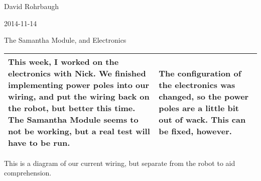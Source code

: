 David Rohrbaugh

2014-11-14

The Samantha Module, and Electronics

\begin{tabular}{|p{5cm}|p{5cm}|}
 \hline
 This week, I worked on the electronics with Nick. We finished implementing power poles into our wiring, and put the wiring back on the robot, but better this time. The Samantha Module seems to not be working, but a real test will have to be run.
 &
 The configuration of the electronics was changed, so the power poles are a little bit out of wack. This can be fixed, however.
 \\
 \hline
\end{tabular}

\medskip

This is a diagram of our current wiring, but separate from the robot to aid comprehension.

\begin{center}
\end{center}
